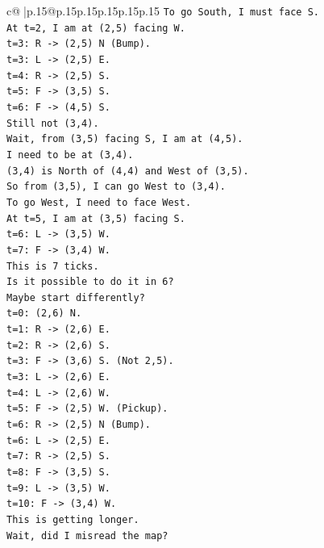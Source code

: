 \documentclass{article}
\begin{document}
{\begin{supertabular}{c@{$\;$}|p{.15\linewidth}@{}p{.15\linewidth}p{.15\linewidth}p{.15\linewidth}p{.15\linewidth}p{.15\linewidth}}
{{{\texttt{To go South, I must face S.} \\
\texttt{At t=2, I am at (2,5) facing W.} \\
\texttt{t=3: R {-}> (2,5) N (Bump).} \\
\texttt{t=3: L {-}> (2,5) E.} \\
\texttt{t=4: R {-}> (2,5) S.} \\
\texttt{t=5: F {-}> (3,5) S.} \\
\texttt{t=6: F {-}> (4,5) S.} \\
\texttt{Still not (3,4).} \\
\texttt{Wait, from (3,5) facing S, I am at (4,5).} \\
\texttt{I need to be at (3,4).} \\
\texttt{(3,4) is North of (4,4) and West of (3,5).} \\
\texttt{So from (3,5), I can go West to (3,4).} \\
\texttt{To go West, I need to face West.} \\
\texttt{At t=5, I am at (3,5) facing S.} \\
\texttt{t=6: L {-}> (3,5) W.} \\
\texttt{t=7: F {-}> (3,4) W.} \\
\texttt{This is 7 ticks.} \\
\texttt{Is it possible to do it in 6?} \\
\texttt{Maybe start differently?} \\
\texttt{t=0: (2,6) N.} \\
\texttt{t=1: R {-}> (2,6) E.} \\
\texttt{t=2: R {-}> (2,6) S.} \\
\texttt{t=3: F {-}> (3,6) S. (Not 2,5).} \\
\texttt{t=3: L {-}> (2,6) E.} \\
\texttt{t=4: L {-}> (2,6) W.} \\
\texttt{t=5: F {-}> (2,5) W. (Pickup).} \\
\texttt{t=6: R {-}> (2,5) N (Bump).} \\
\texttt{t=6: L {-}> (2,5) E.} \\
\texttt{t=7: R {-}> (2,5) S.} \\
\texttt{t=8: F {-}> (3,5) S.} \\
\texttt{t=9: L {-}> (3,5) W.} \\
\texttt{t=10: F {-}> (3,4) W.} \\
\texttt{This is getting longer.} \\
\texttt{Wait, did I misread the map?} \\
}}}
\end{supertabular}}
\end{document}
